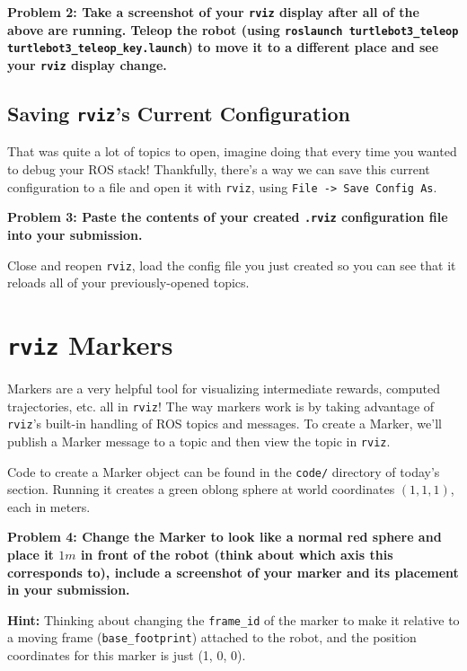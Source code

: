 \documentclass{article}
\begin{document}
{\bf Problem 2: Take a screenshot of your \texttt{rviz} display after all of the above are running. Teleop the robot (using \texttt{roslaunch turtlebot3\_teleop turtlebot3\_teleop\_key.launch}) to move it to a different place and see your \texttt{rviz} display change.}

\subsection{Saving \texttt{rviz}'s Current Configuration}

That was quite a lot of topics to open, imagine doing that every time you wanted to debug your ROS stack! Thankfully, there's a way we can save this current configuration to a file and open it with \texttt{rviz}, using \texttt{File -> Save Config As}. 

{\bf Problem 3: Paste the contents of your created \texttt{.rviz} configuration file into your submission.}

Close and reopen \texttt{rviz}, load the config file you just created so you can see that it reloads all of your previously-opened topics.

\section{\texttt{rviz} Markers}

Markers are a very helpful tool for visualizing intermediate rewards, computed trajectories, etc. all in \texttt{rviz}! The way markers work is by taking advantage of \texttt{rviz}'s built-in handling of ROS topics and messages. To create a Marker, we'll publish a Marker message to a topic and then view the topic in \texttt{rviz}.

Code to create a Marker object can be found in the \texttt{code/} directory of today's section. Running it creates a green oblong sphere at world coordinates $(1, 1, 1)$, each in meters.

{\bf Problem 4: Change the Marker to look like a normal red sphere and place it $1m$ in front of the robot (think about which axis this corresponds to), include a screenshot of your marker and its placement in your submission.}

\textbf{Hint:} Thinking about changing the \texttt{frame\_id} of the marker to make it relative to a moving frame (\texttt{base\_footprint}) attached to the robot, and the position coordinates for this marker is just (1, 0, 0).
\end{document}

